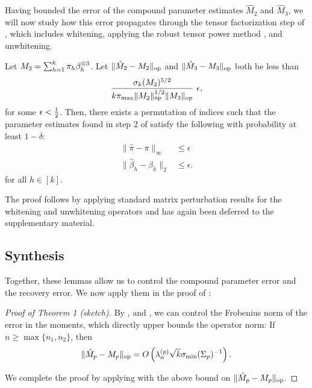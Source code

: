 Having bounded the error of the compound parameter estimates $\hat M_2$ and $\hat M_3$,
we will now study how this error propagates through the tensor factorization step of 
,
which includes whitening, applying the robust tensor power method \cite{AnandkumarGeHsu2012},
and unwhitening.
\begin{lemma}
  \label{lem:tensorPower}
  Let $M_3 = \sum_{h=1}^{k} \pi_h \beta_h^{\otimes 3}$.
  Let $\|\hat M_2 - M_2\|_{\text{\rm op}}$ and $\|\hat M_3 - M_3\|_{\text{\rm op}}$ both be less than
  \vspace{-0.5em}
  $$\frac{\sigma_k(M_2)^{5/2}}{k \pi_{\max} \|M_2\|_{\text{\rm op}}^{1/2} \| {M_3} \|_{\text{\rm op}}}~ \epsilon,$$
  for some $\epsilon < \frac{1}{2}$. 
  Then, there exists a permutation of indices such that  the parameter
  estimates found in step 2 of 
  satisfy the following with probability at least $1 - \delta$:
  \begin{align*}
  \|\hat \pi - \pi \|_{\infty} &\le \epsilon \\
  \|\hat \beta_h - \beta_h\|_2 &\le \epsilon.
  \end{align*}
  for all $h \in [k]$.
\end{lemma}

The proof follows by applying standard matrix perturbation results for
the whitening and unwhitening operators and has again been deferred
to the supplementary material.

\subsection{Synthesis}
Together, these lemmas allow us to control the compound parameter error
and the recovery error. We now apply them in the proof of
:

\begin{proof}[Proof of Theorem 1 (sketch)]
By ,  and , we
can control the Frobenius norm of the error in the moments, which
directly upper bounds the operator norm: If $n \ge \max\{n_1, n_2\}$,
then
\begin{align}
  \|\hat M_p - M_p\|_{\text{\rm op}} = O\left( \lambda_n^{(p)} \sqrt{k} \sigma_\text{\rm min}(\Sigma_p)^{-1} \right).
\end{align}

We complete the proof by applying  with the above
bound on $\|\hat M_p - M_p\|_{\text{\rm op}}$.

\end{proof}

